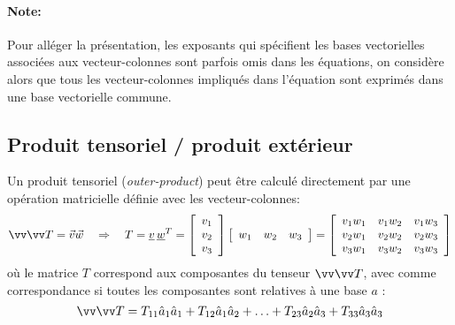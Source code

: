 \paragraph{Note:}
Pour alléger la présentation, les exposants qui spécifient les bases vectorielles associées aux vecteur-colonnes sont parfois omis dans les équations, on considère alors que tous les vecteur-colonnes impliqués dans l'équation sont exprimés dans une base vectorielle commune.


\subsection{Produit tensoriel / produit extérieur}
%
Un produit tensoriel (\textit{outer-product}) peut être calculé directement par une opération matricielle définie avec les vecteur-colonnes:
\begin{equation}
 \tensor{T} = \vec{v} \vec{w} \quad \Rightarrow \quad  T = \col{v} \, \col{w}^T =
 \left[ \begin{array}{c}     v_1 \\ v_2 \\ v_3  \end{array} \right]
 \left[ \begin{array}{c c c} w_1 &  w_2 &  w_3  \end{array} \right] =
 \left[ \begin{array}{c c c}
         v_1 w_1 & v_1 w_2 & v_1 w_3  \\
         v_2 w_1 & v_2 w_2 & v_2 w_3         \\
         v_3 w_1 & v_3 w_2 & v_3 w_3
 \end{array}  \right]
\end{equation}
où le matrice $T$ correspond aux composantes du tenseur $\tensor{T}$, avec comme correspondance si toutes les composantes sont relatives à une base $a$ :
\begin{equation}
 \tensor{T} = T_{11} \hat{a}_1 \hat{a}_1  + T_{12} \hat{a}_1 \hat{a}_2 + \hdots + T_{23} \hat{a}_2 \hat{a}_3  + T_{33} \hat{a}_3 \hat{a}_3
\end{equation}

